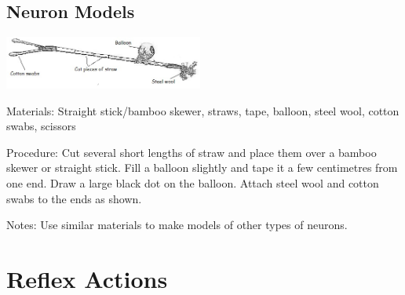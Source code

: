 \begin{multicols}{2}
\subsection{Neuron Models}

\begin{center}
\includegraphics[width=0.49\textwidth]{./img/neuron-model.jpg}
\end{center}

\begin{description*}
\item[Materials:]{Straight stick/bamboo skewer, straws, tape, balloon, steel wool, cotton swabs, scissors}
\item[Procedure:]{Cut several short lengths of straw and place them over a bamboo skewer or straight stick. Fill a balloon slightly and tape it a few centimetres from one end. Draw a large black dot on the balloon. Attach steel wool and cotton swabs to the ends as shown.}
\item[Notes:]{Use similar materials to make models of other types of neurons.}
\end{description*}


\section*{Reflex Actions} 



\end{multicols}
